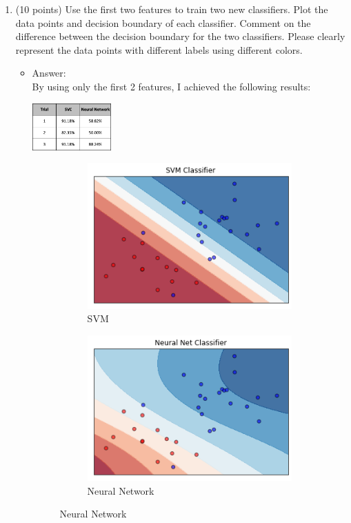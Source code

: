 \documentclass[twoside,10pt]{article}
\begin{document}
\begin{enumerate}
\begin{enumerate}
\begin{itemize}
	\end{itemize}
	\item (10 points) Use the first two features to train two new classifiers. Plot the data points and decision boundary of each classifier. Comment on the difference between the decision boundary for the two classifiers. Please clearly represent the data points with different labels using different colors.
	
\begin{itemize}
\item Answer:\\
By using only the first 2 features, I achieved the following results:
\begin{center}
\includegraphics[width = 0.25\textwidth]{Q4b.png}
\end{center}


\begin{figure}
\begin{subfigure}{.5\textwidth}
  \centering
  \includegraphics[width=.8\linewidth]{svmboundary.png}
  \caption{SVM}
  \label{fig:sfig1}
\end{subfigure}%
\begin{subfigure}{.5\textwidth}
  \centering
  \includegraphics[width=.8\linewidth]{nnboundary.png}
  \caption{Neural Network}
  \label{fig:sfig2}
\end{subfigure}


\end{figure}
\end{itemize}
\end{enumerate}
\end{enumerate}
\end{document}
